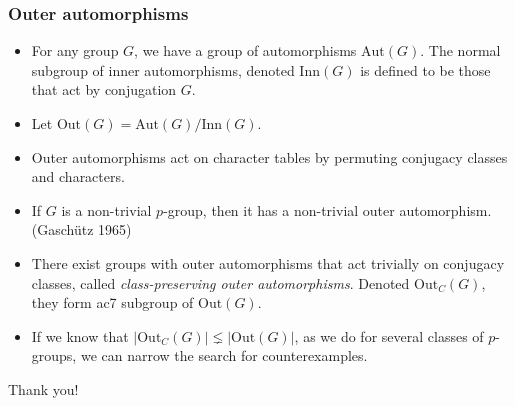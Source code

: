 \documentclass[xcolor=dvipsnames]{beamer}
\theoremstyle{remark}
\theoremstyle{plain}
\theoremstyle{definition}
\begin{document}
\begin{frame}
\frametitle{Outer automorphisms}
\begin{itemize}
\item For any group $G$, we have a group of automorphisms
$\mathrm{Aut}(G)$. The normal subgroup of inner automorphisms, denoted
$\mathrm{Inn}(G)$ is defined to be those that act by conjugation $G$.\pause

\item Let $\mathrm{Out}(G)=\mathrm{Aut}(G)/\mathrm{Inn}(G)$.\pause

\item Outer automorphisms act on character tables by permuting conjugacy
classes and characters.\pause

\item If $G$ is a non-trivial $p$-group, then it has a non-trivial outer
automorphism. (Gasch\"utz 1965)\pause

\item There exist groups with outer automorphisms that act trivially
  on conjugacy classes, called \emph{class-preserving outer
    automorphisms}. Denoted $\mathrm{Out}_C(G)$, they form ac7 subgroup
  of $\mathrm{Out}(G)$.\pause

\item If we know that $|\mathrm{Out}_C(G)|\lneq |\mathrm{Out}(G)|$, as we do
for several classes of $p$-groups, we can narrow the search for
counterexamples. 
\end{itemize}
\end{frame}

\begin{frame}
\centering \LARGE Thank you!
\end{frame}
\end{document}
